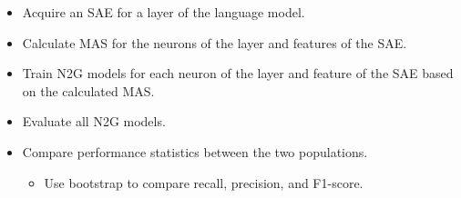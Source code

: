 \documentclass[../main.tex]{subfiles}
\begin{document}
\begin{itemize}
    \item Acquire an SAE for a layer of the language model.
    \item Calculate MAS for the neurons of the layer and features of the SAE.
    \item Train N2G models for each neuron of the layer and feature of the SAE based on the calculated MAS.
    \item Evaluate all N2G models.
    \item Compare performance statistics between the two populations.
    \begin{itemize}
        \item Use bootstrap to compare recall, precision, and F1-score.
    \end{itemize}
\end{itemize}

\end{document}
